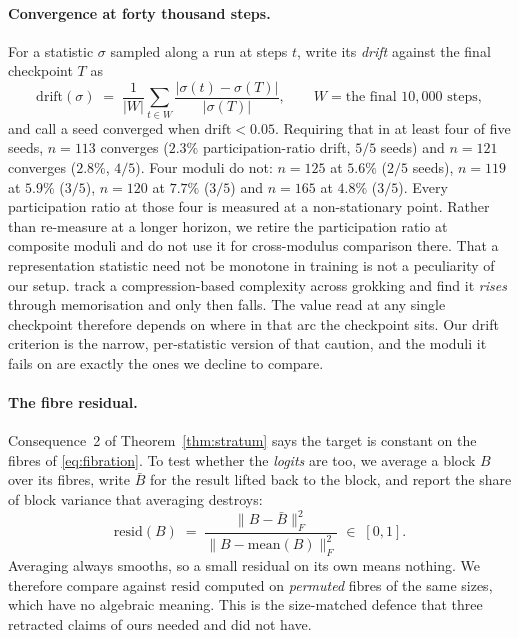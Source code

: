 \paragraph{Convergence at forty thousand steps.} For a
statistic $\sigma$ sampled along a run at steps $t$, write its \emph{drift} against the final
checkpoint $T$ as
\begin{equation}
  \label{eq:drift}
  \mathrm{drift}(\sigma) \;=\;
  \frac{1}{|W|}\sum_{t \in W} \frac{\bigl|\sigma(t) - \sigma(T)\bigr|}{|\sigma(T)|},
  \qquad W = \text{the final } 10{,}000 \text{ steps},
\end{equation}
and call a seed converged when $\mathrm{drift} < 0.05$. Requiring that in at least four of
five seeds, $n = 113$
converges ($2.3\%$ participation-ratio drift, $5/5$ seeds) and $n = 121$ converges ($2.8\%$,
$4/5$). Four moduli do not: $n = 125$ at $5.6\%$ ($2/5$ seeds), $n = 119$ at $5.9\%$ ($3/5$),
$n = 120$ at $7.7\%$ ($3/5$) and $n = 165$ at $4.8\%$ ($3/5$). Every participation ratio at
those four is measured at a non-stationary point. Rather than re-measure at a longer horizon,
we retire the participation ratio at composite moduli and do not use it for cross-modulus
comparison there.
That a representation statistic need not be monotone in training is not a peculiarity of our
setup. \citet{demoss2025complexity} track a compression-based complexity across grokking and
find it \emph{rises} through memorisation and only then falls. The value read at any single
checkpoint therefore depends on where in that arc the checkpoint sits. Our drift criterion is the
narrow, per-statistic version of that caution, and the moduli it fails on are exactly the ones
we decline to compare.

\paragraph{The fibre residual.} Consequence~2 of Theorem~\ref{thm:stratum} says the target is
constant on the fibres of \eqref{eq:fibration}. To test whether the \emph{logits} are too, we
average a block $B$ over its fibres, write $\bar{B}$ for the result lifted back to the block,
and report the share of block variance that averaging destroys:
\begin{equation}
  \label{eq:resid}
  \mathrm{resid}(B) \;=\;
  \frac{\bigl\lVert B - \bar{B} \bigr\rVert_{F}^{2}}
       {\bigl\lVert B - \mathrm{mean}(B) \bigr\rVert_{F}^{2}} \;\in\; [0, 1].
\end{equation}
Averaging always smooths, so a small residual on its own means nothing. We therefore compare
against $\mathrm{resid}$ computed on
\emph{permuted} fibres of the same sizes, which have no algebraic meaning. This is the
size-matched defence that three retracted claims of ours needed and did not have.

